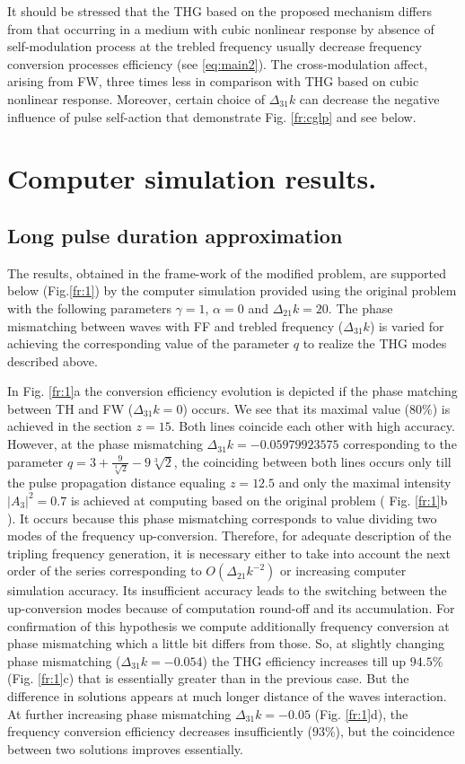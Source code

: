 \documentclass[a4paper, 12pt, onecolumn]{extarticle}
\begin{document}
It should be stressed that the THG based on the proposed mechanism differs from that occurring  in a medium with cubic nonlinear response by absence of  self-modulation process at the trebled frequency  usually decrease frequency conversion processes efficiency (see \eqref{eq:main2}). The cross-modulation affect, arising from FW, three times less in comparison with THG based on cubic nonlinear response. Moreover, certain choice of $\Delta_{31}k$ can decrease the negative influence of pulse self-action  that demonstrate Fig. \ref{fr:cglp} and see below. 

\section*{Computer simulation results.}

\subsection*{Long pulse duration approximation}

The results, obtained in the frame-work of  the modified problem, are supported below (Fig.\ref{fr:1}) by the computer simulation provided using the original problem with the following parameters $\gamma=1$,   $\alpha=0$ and $\Delta_{21}k=20$. The phase mismatching between waves with FF and trebled frequency ($\Delta_{31}k$) is varied for achieving the corresponding value of the parameter $q$ to realize the THG modes described above. 

In Fig. \ref{fr:1}a the conversion efficiency evolution is depicted if the phase matching between TH and FW ($\Delta_{31}k=0$) occurs. We see that its maximal value ($80\%$) is achieved  in the section $z=15$. Both lines coincide each other with high accuracy.  However, at the phase mismatching $\Delta_{31}k=-0.05979923575$ corresponding to the parameter $q=3+ \frac{9}{\sqrt[3]{2}}-9\sqrt[3]{2}$, the coinciding between both lines occurs only till the pulse propagation distance equaling $z=12.5$ and only the maximal intensity $|A_3|^2=0.7$ is achieved at computing based on the original problem ( Fig. \ref{fr:1}b ). It occurs because this phase mismatching corresponds to value dividing two modes of the frequency up-conversion.  Therefore, for adequate description of the tripling frequency generation, it is necessary either to take into account the next order of the series corresponding to $O (\Delta_{21}k^{-2}) $ or increasing computer simulation accuracy. Its insufficient accuracy leads to the switching between the up-conversion modes because of computation round-off and its accumulation. For confirmation of this hypothesis we compute additionally frequency conversion at phase mismatching which a little bit differs from those. So, at  slightly changing phase mismatching  ($\Delta_{31}k=-0.054$) the THG efficiency increases till up  $94.5\%$ (Fig. \ref{fr:1}c) that is essentially greater than in the previous case. But the difference in solutions appears at much longer distance of the  waves interaction. At further increasing phase mismatching  $\Delta_{31}k=-0.05$ (Fig. \ref{fr:1}d), the frequency conversion efficiency decreases insufficiently ($93\%$), but the coincidence between two solutions improves essentially.
\end{document}
